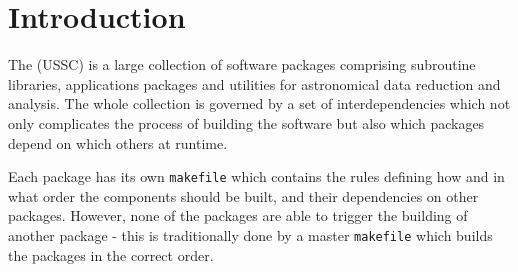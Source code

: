 %
%

\section{Introduction}

The  (USSC) is a large collection of
software packages comprising subroutine libraries, applications
packages and utilities for astronomical data reduction and analysis.
The whole collection is governed by a set of interdependencies which
not only complicates the process of building the software but also
which packages depend on which others at runtime.

Each package has its own {\tt{makefile}} which contains the rules
defining how and in what order the components should be built, and
their dependencies on other packages.  However, none of the packages
are able to trigger the building of another package - this is
traditionally done by a master {\tt{makefile}} which builds the
packages in the correct order.

